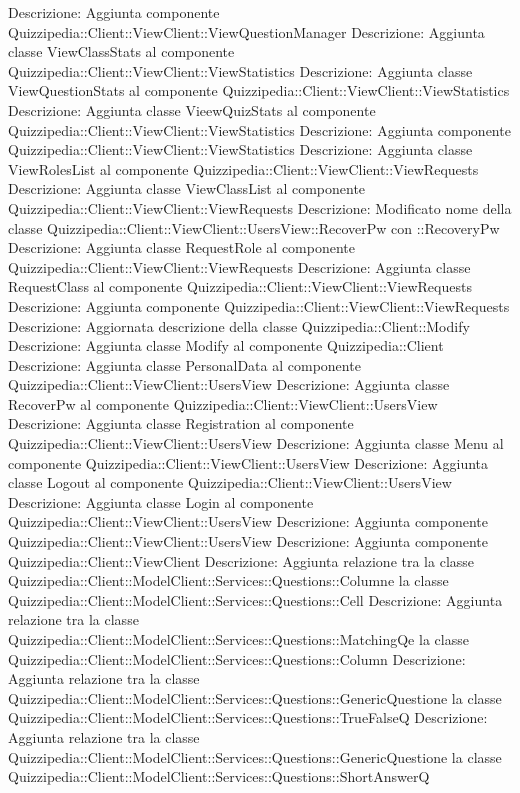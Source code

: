Descrizione: Aggiunta componente Quizzipedia::Client::ViewClient::ViewQuestionManager 
Descrizione: Aggiunta classe ViewClassStats al componente Quizzipedia::Client::ViewClient::ViewStatistics 
Descrizione: Aggiunta classe ViewQuestionStats al componente Quizzipedia::Client::ViewClient::ViewStatistics 
Descrizione: Aggiunta classe VieewQuizStats al componente Quizzipedia::Client::ViewClient::ViewStatistics 
Descrizione: Aggiunta componente Quizzipedia::Client::ViewClient::ViewStatistics 
Descrizione: Aggiunta classe ViewRolesList al componente Quizzipedia::Client::ViewClient::ViewRequests 
Descrizione: Aggiunta classe ViewClassList al componente Quizzipedia::Client::ViewClient::ViewRequests 
Descrizione: Modificato nome della classe Quizzipedia::Client::ViewClient::UsersView::RecoverPw con ::RecoveryPw 
Descrizione: Aggiunta classe RequestRole al componente Quizzipedia::Client::ViewClient::ViewRequests 
Descrizione: Aggiunta classe RequestClass al componente Quizzipedia::Client::ViewClient::ViewRequests 
Descrizione: Aggiunta componente Quizzipedia::Client::ViewClient::ViewRequests 
Descrizione: Aggiornata descrizione della classe Quizzipedia::Client::Modify 
Descrizione: Aggiunta classe Modify al componente Quizzipedia::Client 
Descrizione: Aggiunta classe PersonalData al componente Quizzipedia::Client::ViewClient::UsersView 
Descrizione: Aggiunta classe RecoverPw al componente Quizzipedia::Client::ViewClient::UsersView 
Descrizione: Aggiunta classe Registration al componente Quizzipedia::Client::ViewClient::UsersView 
Descrizione: Aggiunta classe Menu al componente Quizzipedia::Client::ViewClient::UsersView 
Descrizione: Aggiunta classe Logout al componente Quizzipedia::Client::ViewClient::UsersView 
Descrizione: Aggiunta classe Login al componente Quizzipedia::Client::ViewClient::UsersView 
Descrizione: Aggiunta componente Quizzipedia::Client::ViewClient::UsersView 
Descrizione: Aggiunta componente Quizzipedia::Client::ViewClient 
Descrizione: Aggiunta relazione tra la classe Quizzipedia::Client::ModelClient::Services::Questions::Columne la classe Quizzipedia::Client::ModelClient::Services::Questions::Cell 
Descrizione: Aggiunta relazione tra la classe Quizzipedia::Client::ModelClient::Services::Questions::MatchingQe la classe Quizzipedia::Client::ModelClient::Services::Questions::Column 
Descrizione: Aggiunta relazione tra la classe Quizzipedia::Client::ModelClient::Services::Questions::GenericQuestione la classe Quizzipedia::Client::ModelClient::Services::Questions::TrueFalseQ 
Descrizione: Aggiunta relazione tra la classe Quizzipedia::Client::ModelClient::Services::Questions::GenericQuestione la classe Quizzipedia::Client::ModelClient::Services::Questions::ShortAnswerQ 
